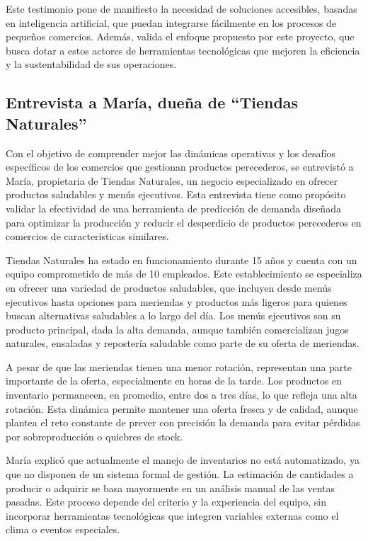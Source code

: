 Este testimonio pone de manifiesto la necesidad de soluciones accesibles, basadas en inteligencia artificial, que puedan integrarse fácilmente en los procesos de pequeños comercios. Además, valida el enfoque propuesto por este proyecto, que busca dotar a estos actores de herramientas tecnológicas que mejoren la eficiencia y la sustentabilidad de sus operaciones.


\subsection{Entrevista a María, dueña de ``Tiendas Naturales''}

Con el objetivo de comprender mejor las dinámicas operativas y los desafíos específicos de los comercios que gestionan productos perecederos, se entrevistó a María, propietaria de Tiendas Naturales, un negocio especializado en ofrecer productos saludables y menús ejecutivos. Esta entrevista tiene como propósito validar la efectividad de una herramienta de predicción de demanda diseñada para optimizar la producción y reducir el desperdicio de productos perecederos en comercios de características similares.

Tiendas Naturales ha estado en funcionamiento durante 15 años y cuenta con un equipo comprometido de más de 10 empleados. Este establecimiento se especializa en ofrecer una variedad de productos saludables, que incluyen desde menús ejecutivos hasta opciones para meriendas y productos más ligeros para quienes buscan alternativas saludables a lo largo del día. Los menús ejecutivos son su producto principal, dada la alta demanda, aunque también comercializan jugos naturales, ensaladas y repostería saludable como parte de su oferta de meriendas.

\indent A pesar de que las meriendas tienen una menor rotación, representan una parte importante de la oferta, especialmente en horas de la tarde. Los productos en inventario permanecen, en promedio, entre dos a tres días, lo que refleja una alta rotación. Esta dinámica permite mantener una oferta fresca y de calidad, aunque plantea el reto constante de prever con precisión la demanda para evitar pérdidas por sobreproducción o quiebres de stock.

\indent María explicó que actualmente el manejo de inventarios no está automatizado, ya que no disponen de un sistema formal de gestión. La estimación de cantidades a producir o adquirir se basa mayormente en un análisis manual de las ventas pasadas. Este proceso depende del criterio y la experiencia del equipo, sin incorporar herramientas tecnológicas que integren variables externas como el clima o eventos especiales.

